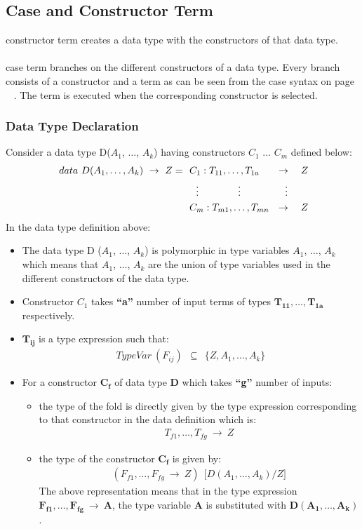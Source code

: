 \documentclass[11pt]{article}
\begin{document}
\subsection {Case and Constructor Term}
{\sf constructor } term creates a data type with the constructors of that data type.
~~\\~~\\
{\sf case} term branches on the different constructors of a data type. Every branch consists of a constructor and a term as can be seen from the case syntax on page ~ \pageref{caseLab}. The term is executed when the corresponding constructor is selected. 
\subsubsection {Data Type Declaration}\label{dataDef}
Consider a data type D($A_1$, $\ldots$, $A_k$) having constructors $C_1$ $\ldots$ $C_m$ defined below: 
\begin{align*} 
~data~ D(A_1,\ldots,A_k)  ~\to~ Z =
 & ~~ C_1 : T_{11},\ldots, T_{1a} ~~~~~\to ~~~ Z \\
 & ~~~~ \vdots \hskip 4em \vdots \hskip 4.5em \vdots \\ 
 & ~~ C_m : T_{m1},\ldots, T_{mn} ~~\to ~~~ Z
\end{align*}
In the data type definition above:
\begin{itemize}
  \item The data type D ($A_1$, $\ldots$, $A_k$) is polymorphic in type variables $A_1$, $\ldots$, $A_k$ which means that $A_1$, $\ldots$, $A_k$ are the union of type variables used in the different constructors of the data type.
  \item Constructor $C_1$ takes {\bf ``a''} number of input terms of types $\mathbf{T_{11},\ldots,T_{1a}}$ respectively.
  \item $\mathbf{T_{ij}}$ is a type expression such that:
\begin{align*}
TypeVar~(F_{ij})~~\subseteq~~ \{Z,A_1,\ldots,A_k\}
\end{align*}
\item For a constructor $\mathbf{C_f}$ of data type $\mathbf{D}$ which takes {\bf ``g''} number of inputs:
\begin{itemize}
  \item the type of the {\sf fold} is directly given by the type expression corresponding to that constructor in the data definition which is:
  \begin{align*}
    T_{f1},\ldots,T_{fg}~\to~Z
  \end{align*}
  \item the type of the constructor $\mathbf{C_f}$ is given by:
  \begin{align*}
    (F_{f1},\ldots,F_{fg}~\to~Z)~~\Big[D(A_1,\ldots,A_k)/Z\Big]
  \end{align*}
  The above representation means that in the type expression $\mathbf{F_{f1},\ldots,F_{fg}~\to~A}$, the type variable $\mathbf{A}$ is substituted with $\mathbf{D(A_1,\ldots,A_k)}$.
\end{itemize}
\end{itemize}
\end{document}

